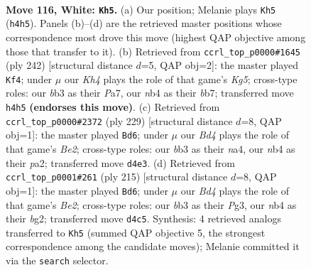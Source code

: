 \documentclass[11pt]{article}
\begin{document}
\clearpage

\begin{figure}[p]\centering
\begin{subfigure}{0.46\textwidth}\centering
\resizebox{\linewidth}{!}{%
\newchessgame
\chessboard[
  setfen={8/7k/8/8/1n1B3K/1b6/5P2/8 w - - 77 116},
  showmover=false,
  pgfstyle=straightmove, color=movearrow, markmove={h4-h5}
]}
\caption{}
\end{subfigure}\hfill
\begin{subfigure}{0.46\textwidth}\centering
\resizebox{\linewidth}{!}{%
\newchessgame
\chessboard[
  setfen={5B2/Pb6/4k3/2P3K1/8/8/8/8 w - - 13 122},
  showmover=false,
  pgfstyle=straightmove, color=movearrow, markmove={g5-f4}
]}
\caption{}
\end{subfigure}
\\[4pt]
\begin{subfigure}{0.46\textwidth}\centering
\resizebox{\linewidth}{!}{%
\newchessgame
\chessboard[
  setfen={8/4b3/2k5/8/N1K5/p7/P7/8 b - - 87 115},
  showmover=false,
  pgfstyle=straightmove, color=movearrow, markmove={e7-d6}
]}
\caption{}
\end{subfigure}\hfill
\begin{subfigure}{0.46\textwidth}\centering
\resizebox{\linewidth}{!}{%
\newchessgame
\chessboard[
  setfen={8/4b3/1k6/2p5/8/1K4p1/6B1/8 b - - 87 108},
  showmover=false,
  pgfstyle=straightmove, color=movearrow, markmove={e7-d6}
]}
\caption{}
\end{subfigure}
\caption{\textbf{Move 116, White: \texttt{Kh5}.} (a) Our position; Melanie plays \texttt{Kh5} (\texttt{h4h5}). Panels (b)--(d) are the retrieved master positions whose correspondence most drove this move (highest QAP objective among those that transfer to it). (b) Retrieved from \texttt{ccrl\_top\_p0000\#1645} (ply 242) [structural distance $d$=5, QAP obj=2]: the master played \texttt{Kf4}; under $\mu$ our \emph{Kh4} plays the role of that game's \emph{Kg5}; cross-type roles: our \emph{b}b3 as their \emph{P}a7, our \emph{n}b4 as their \emph{b}b7; transferred move \texttt{h4h5} \textbf{(endorses this move)}. (c) Retrieved from \texttt{ccrl\_top\_p0000\#2372} (ply 229) [structural distance $d$=8, QAP obj=1]: the master played \texttt{Bd6}; under $\mu$ our \emph{Bd4} plays the role of that game's \emph{Be2}; cross-type roles: our \emph{b}b3 as their \emph{n}a4, our \emph{n}b4 as their \emph{p}a2; transferred move \texttt{d4e3}. (d) Retrieved from \texttt{ccrl\_top\_p0001\#261} (ply 215) [structural distance $d$=8, QAP obj=1]: the master played \texttt{Bd6}; under $\mu$ our \emph{Bd4} plays the role of that game's \emph{Be2}; cross-type roles: our \emph{b}b3 as their \emph{P}g3, our \emph{n}b4 as their \emph{b}g2; transferred move \texttt{d4c5}. Synthesis: 4 retrieved analogs transferred to \texttt{Kh5} (summed QAP objective 5, the strongest correspondence among the candidate moves); Melanie committed it via the \texttt{search} selector.}
\label{fig:thought-m230}
\end{figure}
\end{document}
